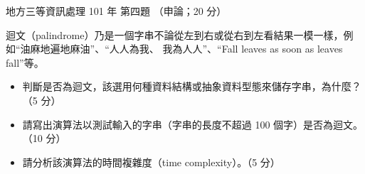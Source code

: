 \begin{pastexam}[label={px:df3-101-ds-04}]{地方三等資訊處理 101 年 第四題}
（申論；20 分）

迴文（palindrome）乃是一個字串不論從左到右或從右到左看結果一模一樣，例如“油麻地遍地麻油”、“人人為我、
我為人人”、“Fall leaves as soon as leaves fall”等。
\begin{itemize}[leftmargin=2.2em]
\item[㈠] 判斷是否為迴文，該選用何種資料結構或抽象資料型態來儲存字串，為什麼？（5 分）
\item[㈡] 請寫出演算法以測試輸入的字串（字串的長度不超過 100 個字）是否為迴文。（10 分）
\item[㈢] 請分析該演算法的時間複雜度（time complexity）。（5 分）
\end{itemize}
\end{pastexam}

